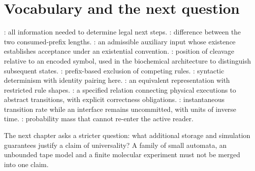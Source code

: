 \section{Vocabulary and the next question}
: all information needed to determine legal next steps.
: difference between the two consumed-prefix lengths.
: an admissible auxiliary input whose existence establishes
acceptance under an existential convention.
: position of cleavage relative to an encoded symbol,
used in the biochemical architecture to distinguish subsequent states.
: prefix-based exclusion of competing rules.
: syntactic determinism with identity pairing here.
: an equivalent representation with restricted rule shapes.
: a specified relation connecting physical executions to
abstract transitions, with explicit correctness obligations.
: instantaneous transition rate while an interface
remains uncommitted, with units of inverse time.
: probability mass that cannot re-enter the active reader.

The next chapter asks a stricter question: what additional storage and
simulation guarantees justify a claim of universality? A family of small
automata, an unbounded tape model and a finite molecular experiment must not
be merged into one claim.
